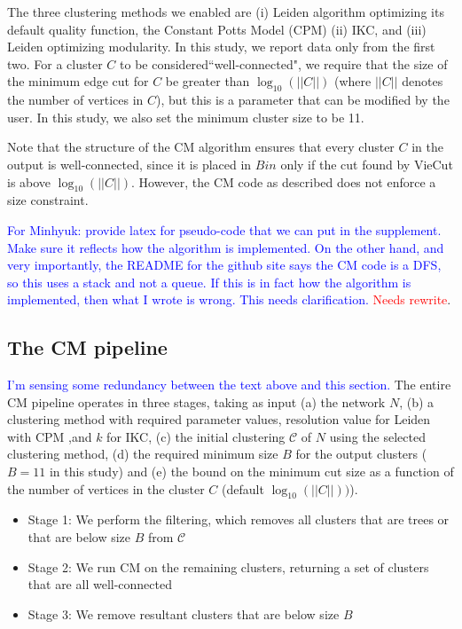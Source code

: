 \documentclass[12pt, oneside]{article}   	%
\begin{document}
The three clustering methods we enabled are (i) Leiden algorithm optimizing its default quality function, the Constant Potts Model (CPM) (ii) IKC, and (iii) Leiden optimizing modularity. In this study, we report data only from the first two. 
For  a cluster $C$ to be considered``well-connected", we require that the size of the minimum edge cut for $C$ be greater than $\log_{10}(||C||)$ (where $||C||$ denotes the number of vertices in $C$), but this is a parameter that can be modified by the user.  In this study, we also set the minimum cluster size to be 11. 


Note that the structure of the CM algorithm ensures that every cluster $C$ in the output is well-connected, since it is 
placed in $Bin$ only if the cut found by VieCut is above $\log_{10}(||C||)$.
However, the CM code as described does not enforce a size constraint.

\textcolor{blue}{For Minhyuk: provide latex for pseudo-code that we can put in the supplement. Make sure it reflects how the algorithm is implemented. On the other hand, and very importantly, the README for the github site says the CM code is a DFS, so this uses a stack and not a queue.  If this is in fact how the algorithm is implemented, then what I wrote is wrong. This needs clarification.} \textcolor{red}{Needs rewrite}.

\subsection{The CM pipeline} \textcolor{blue}{I'm sensing some redundancy between the text above and this section.}
The entire CM pipeline operates in three stages, taking as input (a) the network $N$,  (b) a clustering method with required parameter values,  resolution value for Leiden with CPM ,and $k$ for IKC,
(c)  the initial clustering $\mathcal{C}$ of $N$ using the selected clustering method, 
(d) the required minimum size $B$ for the output clusters ($B=11$ in this study)
and (e) the bound on the minimum cut size as a function of the number of vertices in the cluster $C$
(default $\log_{10}(||C||))$).

\begin{itemize}
\item Stage 1: We perform the filtering, which removes all clusters that are trees or that are below size $B$ from $\mathcal{C}$
\item Stage 2: We run CM on the remaining clusters, returning a set of clusters that are all well-connected
\item Stage 3: We remove resultant clusters that are below size $B$ 
\end{itemize}
\end{document}
